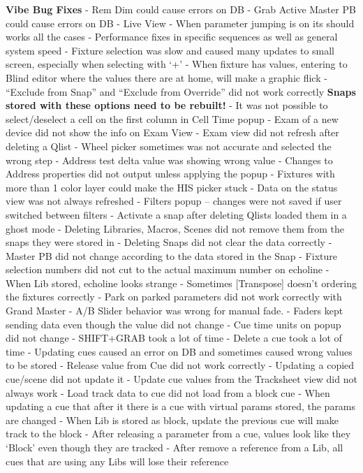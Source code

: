 \documentclass[
]{article}
\begin{document}
\textbf{Vibe Bug Fixes}
- Rem Dim could cause errors on DB
- Grab Active Master PB could cause errors on DB
- Live View - When parameter jumping is on its should works all the cases
- Performance fixes in specific sequences as well as general system speed
- Fixture selection was slow and caused many updates to small screen, especially when selecting with `+'
- When fixture has values, entering to Blind editor where the values there are at home, will make a graphic flick
- ``Exclude from Snap'' and ``Exclude from Override'' did not work correctly \textbf{Snaps stored with these options need to be rebuilt!}
- It was not possible to select/deselect a cell on the first column in Cell Time popup
- Exam of a new device did not show the info on Exam View
- Exam view did not refresh after deleting a Qlist
- Wheel picker sometimes was not accurate and selected the wrong step
- Address test delta value was showing wrong value
- Changes to Address properties did not output unless applying the popup
- Fixtures with more than 1 color layer could make the HIS picker stuck
- Data on the status view was not always refreshed
- Filters popup -- changes were not saved if user switched between filters
- Activate a snap after deleting Qlists loaded them in a ghost mode
- Deleting Libraries, Macros, Scenes did not remove them from the snaps they were stored in
- Deleting Snaps did not clear the data correctly
- Master PB did not change according to the data stored in the Snap
- Fixture selection numbers did not cut to the actual maximum number on echoline
- When Lib stored, echoline looks strange
- Sometimes {[}Transpose{]} doesn't ordering the fixtures correctly
- Park on parked parameters did not work correctly with Grand Master
- A/B Slider behavior was wrong for manual fade.
- Faders kept sending data even though the value did not change
- Cue time units on popup did not change
- SHIFT+GRAB took a lot of time
- Delete a cue took a lot of time
- Updating cues caused an error on DB and sometimes caused wrong values to be stored
- Release value from Cue did not work correctly
- Updating a copied cue/scene did not update it
- Update cue values from the Tracksheet view did not always work
- Load track data to cue did not load from a block cue
- When updating a cue that after it there is a cue with virtual params stored, the params are changed
- When Lib is stored as block, update the previous cue will make track to the block
- After releasing a parameter from a cue, values look like they `Block' even though they are tracked
- After remove a reference from a Lib, all cues that are using any Libs will lose their reference
\end{document}
